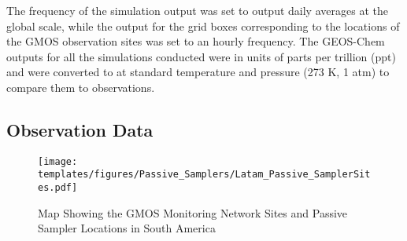 \begin{table}[H]
\label{tab:geos_chem_simulation_description}

\centering
{}

\end{table}
\begin{flushleft}
 The frequency of the simulation output was set to output daily \hg averages at the global scale, while the \hg output for the grid boxes corresponding to the locations of the GMOS observation sites was set to an hourly frequency. The GEOS-Chem outputs for all the simulations conducted were in units of parts per trillion (ppt) and were converted to \nang at standard temperature and pressure (273 K, 1 atm) to compare them to observations.
\end{flushleft}

\subsection{Observation Data}
\begin{figure}[H]
 \centering
  \texttt{[image: templates/figures/Passive\_Samplers/Latam\_Passive\_SamplerSites.pdf]}
  \caption{Map Showing the GMOS Monitoring Network Sites and Passive Sampler Locations in South America \cite{quant_measuring_2021,koenig_seasonal_2021}}
  \label{fig:GMOS_PAS_stations_map}
 
  
\end{figure}
\FloatBarrier

